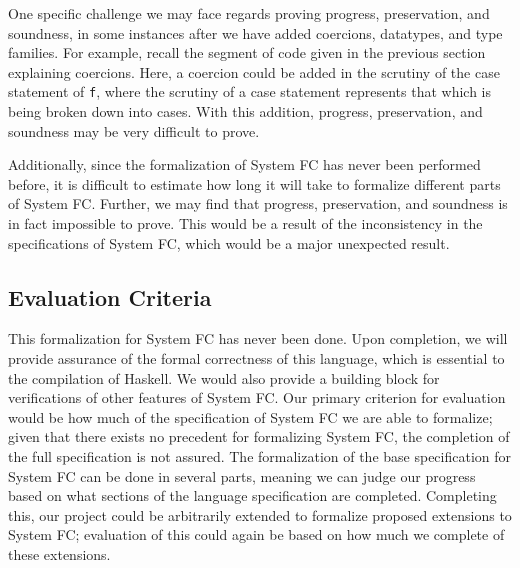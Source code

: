\documentclass{sig-alternate}
\begin{document}
One specific challenge we may face regards proving progress, preservation, and soundness, in some instances after we have added coercions, datatypes, and type families. For example, recall the segment of code given in the previous section explaining coercions. Here, a coercion could be added in the scrutiny of the case statement of \texttt{f}, where the scrutiny of a case statement represents that which is being broken down into cases. With this addition, progress, preservation, and soundness may be very difficult to prove.

Additionally, since the formalization of System FC has never been performed before, it is difficult to estimate how long it will take to formalize different parts of System FC. Further, we may find that progress, preservation, and soundness is in fact impossible to prove. This would be a result of the inconsistency in the specifications of System FC, which would be a major unexpected result.


\subsection{Evaluation Criteria}
\label{subsec:eval_criteria}
This formalization for System FC has never been done. Upon completion, we will provide assurance of the formal correctness of this language, which is essential to the compilation of Haskell. We would also provide a building block for verifications of other features of System FC.
Our primary criterion for evaluation would be how much of the specification of System FC we are able to formalize; given that there exists no precedent for formalizing System FC, the completion of the full specification is not assured. The formalization of the base specification for System FC can be done in several parts, meaning we can judge our progress based on what sections of the language specification are completed. Completing this, our project could be arbitrarily extended to formalize proposed extensions to System FC; evaluation of this could again be based on how much we complete of these extensions.
\end{document}
